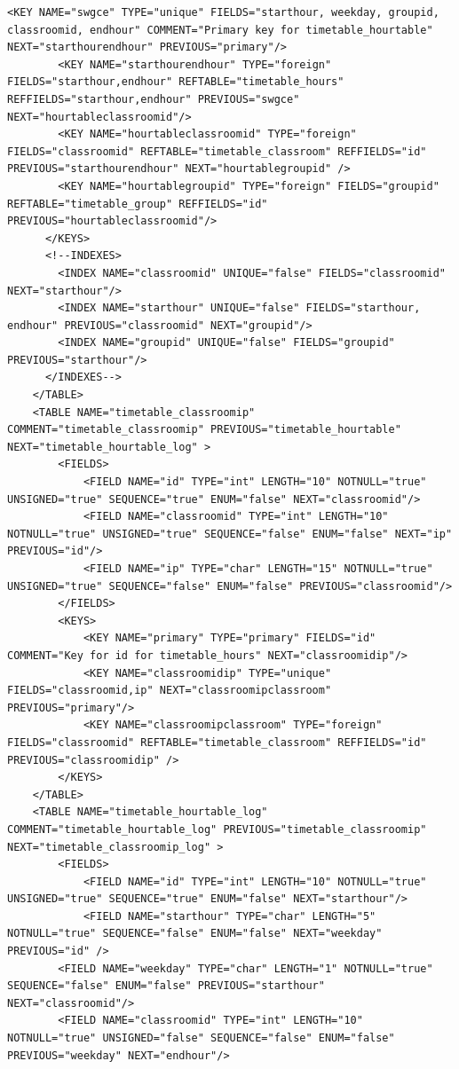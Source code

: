 \documentclass[a4paper]{report}  %
\begin{document}
\begin{lstlisting}[style=XML, caption=Fitxer xmldb install.xml per la creació de les taules]
        <KEY NAME="swgce" TYPE="unique" FIELDS="starthour, weekday, groupid, classroomid, endhour" COMMENT="Primary key for timetable_hourtable" NEXT="starthourendhour" PREVIOUS="primary"/> 
		<KEY NAME="starthourendhour" TYPE="foreign" FIELDS="starthour,endhour" REFTABLE="timetable_hours" REFFIELDS="starthour,endhour" PREVIOUS="swgce" NEXT="hourtableclassroomid"/> 
		<KEY NAME="hourtableclassroomid" TYPE="foreign" FIELDS="classroomid" REFTABLE="timetable_classroom" REFFIELDS="id" PREVIOUS="starthourendhour" NEXT="hourtablegroupid" /> 
		<KEY NAME="hourtablegroupid" TYPE="foreign" FIELDS="groupid" REFTABLE="timetable_group" REFFIELDS="id" PREVIOUS="hourtableclassroomid"/> 
      </KEYS> 
      <!--INDEXES> 
        <INDEX NAME="classroomid" UNIQUE="false" FIELDS="classroomid" NEXT="starthour"/> 
        <INDEX NAME="starthour" UNIQUE="false" FIELDS="starthour, endhour" PREVIOUS="classroomid" NEXT="groupid"/> 
        <INDEX NAME="groupid" UNIQUE="false" FIELDS="groupid" PREVIOUS="starthour"/> 
      </INDEXES--> 
    </TABLE> 
	<TABLE NAME="timetable_classroomip" COMMENT="timetable_classroomip" PREVIOUS="timetable_hourtable" NEXT="timetable_hourtable_log" > 
		<FIELDS> 
		    <FIELD NAME="id" TYPE="int" LENGTH="10" NOTNULL="true" UNSIGNED="true" SEQUENCE="true" ENUM="false" NEXT="classroomid"/> 
			<FIELD NAME="classroomid" TYPE="int" LENGTH="10" NOTNULL="true" UNSIGNED="true" SEQUENCE="false" ENUM="false" NEXT="ip" PREVIOUS="id"/> 
			<FIELD NAME="ip" TYPE="char" LENGTH="15" NOTNULL="true" UNSIGNED="true" SEQUENCE="false" ENUM="false" PREVIOUS="classroomid"/> 
		</FIELDS> 
		<KEYS> 
			<KEY NAME="primary" TYPE="primary" FIELDS="id" COMMENT="Key for id for timetable_hours" NEXT="classroomidip"/>  
			<KEY NAME="classroomidip" TYPE="unique" FIELDS="classroomid,ip" NEXT="classroomipclassroom" PREVIOUS="primary"/> 
			<KEY NAME="classroomipclassroom" TYPE="foreign" FIELDS="classroomid" REFTABLE="timetable_classroom" REFFIELDS="id" PREVIOUS="classroomidip" /> 
		</KEYS> 
	</TABLE> 
	<TABLE NAME="timetable_hourtable_log" COMMENT="timetable_hourtable_log" PREVIOUS="timetable_classroomip" NEXT="timetable_classroomip_log" > 
		<FIELDS> 
			<FIELD NAME="id" TYPE="int" LENGTH="10" NOTNULL="true" UNSIGNED="true" SEQUENCE="true" ENUM="false" NEXT="starthour"/> 
			<FIELD NAME="starthour" TYPE="char" LENGTH="5" NOTNULL="true" SEQUENCE="false" ENUM="false" NEXT="weekday" PREVIOUS="id" /> 
        <FIELD NAME="weekday" TYPE="char" LENGTH="1" NOTNULL="true" SEQUENCE="false" ENUM="false" PREVIOUS="starthour" NEXT="classroomid"/> 
        <FIELD NAME="classroomid" TYPE="int" LENGTH="10" NOTNULL="true" UNSIGNED="false" SEQUENCE="false" ENUM="false" PREVIOUS="weekday" NEXT="endhour"/> 

\end{lstlisting}
\end{document}
